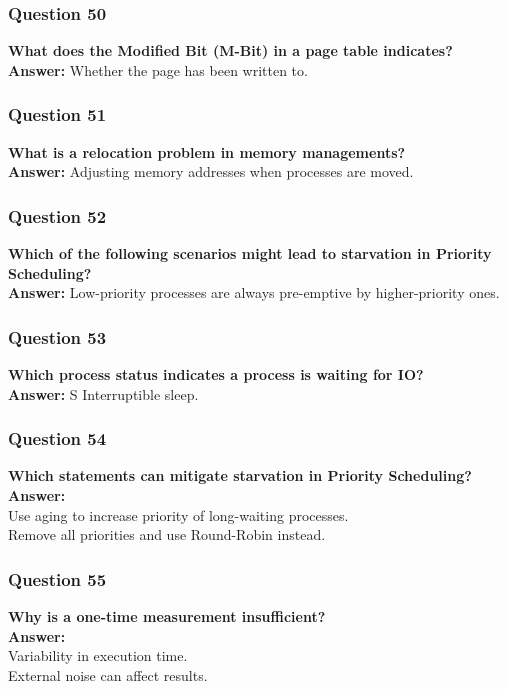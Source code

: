 \documentclass{article}
\begin{document}
\subsubsection*{Question 50}
\textbf{What does the Modified Bit (M-Bit) in a page table indicates?} \\
\textbf{Answer:} Whether the page has been written to.

\subsubsection*{Question 51}
\textbf{What is a relocation problem in memory managements?} \\
\textbf{Answer:} Adjusting memory addresses when processes are moved.

\subsubsection*{Question 52}
\textbf{Which of the following scenarios might lead to starvation in Priority Scheduling?} \\
\textbf{Answer:} Low-priority processes are always pre-emptive by higher-priority ones.

\subsubsection*{Question 53}
\textbf{Which process status indicates a process is waiting for IO?} \\
\textbf{Answer:} S Interruptible sleep.

\subsubsection*{Question 54}
\textbf{Which statements can mitigate starvation in Priority Scheduling?} \\
\textbf{Answer:} \\
Use aging to increase priority of long-waiting processes. \\
Remove all priorities and use Round-Robin instead.

\subsubsection*{Question 55}
\textbf{Why is a one-time measurement insufficient?} \\
\textbf{Answer:} \\
Variability in execution time. \\
External noise can affect results.
\end{document}
